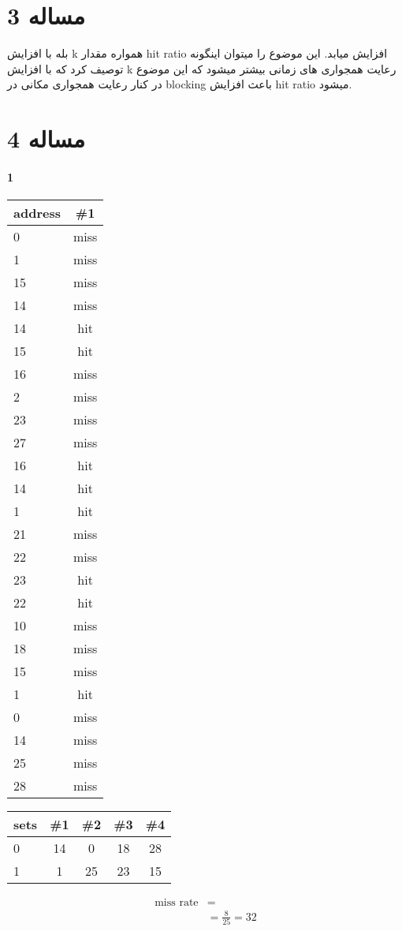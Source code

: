 \documentclass[11pt]{article}
\begin{document}
\section{مساله 3}
بله با افزایش k همواره مقدار hit ratio افزایش میابد. این موضوع را میتوان اینگونه توصیف کرد که با افزایش k رعایت همجواری های زمانی بیشتر میشود که این موضوع در کنار رعایت همجواری مکانی در blocking باعث افزایش hit ratio میشود.
\section{مساله 4}
\paragraph{1}
\begin{center}
	\begin{tabular}{l || c}
		address & \#1 \\
		\hline
		0  & miss \\
		1  & miss \\
		15 & miss \\
		14 & miss \\
		14 & hit  \\
		15 & hit  \\
		16 & miss \\
		2  & miss \\
		23 & miss \\
		27 & miss \\
		16 & hit  \\
		14 & hit  \\
		1  & hit  \\
		21 & miss \\
		22 & miss \\
		23 & hit  \\
		22 & hit  \\
		10 & miss \\
		18 & miss \\
		15 & miss \\
		1  & hit  \\
		0  & miss \\
		14 & miss \\
		25 & miss \\
		28 & miss \\
	\end{tabular}
	\begin{tabular}{l || c | c | c | c}
		sets & \#1 & \#2 & \#3 & \#4 \\
		\hline
		0 & 14 & 0  & 18 & 28 \\
		1 & 1  & 25 & 23 & 15 \\
	\end{tabular}
	\begin{align*}
		\text{miss rate} &= \\
		&= \frac{8}{25} = 32%
	\end{align*}
\end{center}
\end{document}
